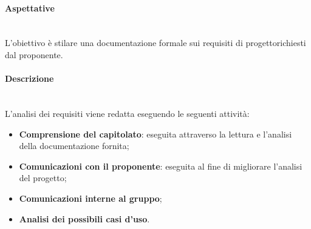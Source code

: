 \paragraph*{Aspettative}\mbox{}\\ [1mm]
L'obiettivo è stilare una documentazione formale sui requisiti di progetto\glosp richiesti dal proponente.
\paragraph*{Descrizione}\mbox{}\\ [1mm]
L'analisi dei requisiti viene redatta eseguendo le seguenti attività:
\begin{itemize}
	\item \textbf{Comprensione del capitolato}\glo: eseguita attraverso la lettura e l'analisi della documentazione fornita;
	\item \textbf{Comunicazioni con il proponente}: eseguita al fine di migliorare l'analisi del progetto\glo;
	\item \textbf{Comunicazioni interne al gruppo};
	\item \textbf{Analisi dei possibili casi d'uso}\glo.
\end{itemize}
